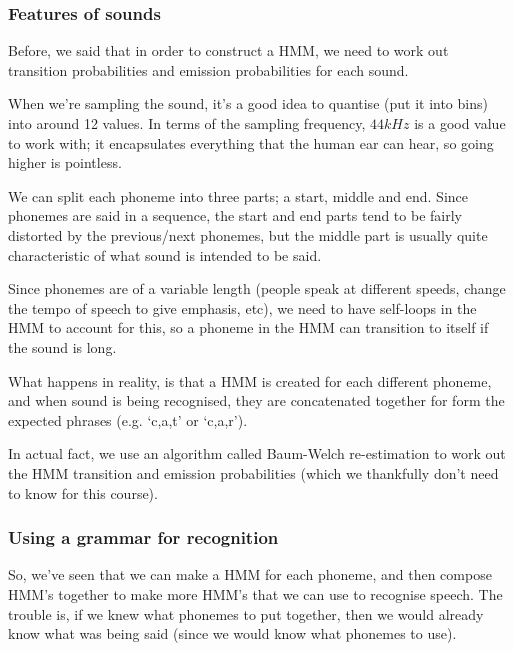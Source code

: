 \subsubsection{Features of sounds}

Before, we said that in order to construct a HMM, we need to work out transition
probabilities and emission probabilities for each sound.


When we're sampling the sound, it's a good idea to quantise (put it into bins)
into around 12 values. In terms of the sampling frequency, $44kHz$ is a
good value to work with; it encapsulates everything that the human ear can hear,
so going higher is pointless.

We can split each phoneme into three parts; a start, middle and end. Since
phonemes are said in a sequence, the start and end parts tend to be fairly
distorted by the previous/next phonemes, but the middle part is usually quite
characteristic of what sound is intended to be said.

Since phonemes are of a variable length (people speak at different speeds,
change the tempo of speech to give emphasis, etc), we need to have self-loops in
the HMM to account for this, so a phoneme in the HMM can transition to itself if
the sound is long.

What happens in reality, is that a HMM is created for each different phoneme,
and when sound is being recognised, they are concatenated together for form the
expected phrases (e.g. `c,a,t' or `c,a,r').

In actual fact, we use an algorithm called Baum-Welch re-estimation to work out
the HMM transition and emission probabilities (which we thankfully don't need
to know for this course).

\subsubsection{Using a grammar for recognition}

So, we've seen that we can make a HMM for each phoneme, and then compose HMM's
together to make more HMM's that we can use to recognise speech. The trouble is,
if we knew what phonemes to put together, then we would already know what was
being said (since we would know what phonemes to use).


